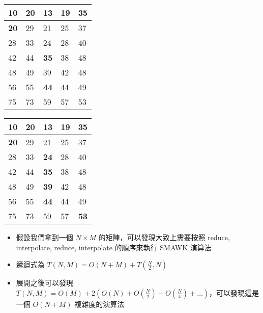 \documentclass[standalone]{beamer}
\begin{document}
\begin{frame}{}
  \begin{center}
    \begin{tabular}{|p{}|p{}|p{}|p{}|p{}|}
      \hline
      10 & 20 & 13 & 19 & 35 \\ [3ex]
      \hline
      \textbf{20} & 29 & 21 & 25 & 37 \\ [3ex]
      \hline
      28 & 33 & 24 & 28 & 40 \\ [3ex]
      \hline
      42 & 44 & \textbf{35} & 38 & 48 \\ [3ex]
      \hline
      48 & 49 & 39 & 42 & 48 \\ [3ex]
      \hline
      56 & 55 & \textbf{44} & 44 & 49 \\ [3ex]
      \hline
      75 & 73 & 59 & 57 & 53 \\ [3ex]
      \hline
    \end{tabular}
  \end{center}
\end{frame}


\begin{frame}{}
  \begin{center}
    \begin{tabular}{|p{}|p{}|p{}|p{}|p{}|}
      \hline
      \textbf{10} & 20 & 13 & 19 & 35 \\ [3ex]
      \hline
      \textbf{20} & 29 & 21 & 25 & 37 \\ [3ex]
      \hline
      28 & 33 & \textbf{24} & 28 & 40 \\ [3ex]
      \hline
      42 & 44 & \textbf{35} & 38 & 48 \\ [3ex]
      \hline
      48 & 49 & \textbf{39} & 42 & 48 \\ [3ex]
      \hline
      56 & 55 & \textbf{44} & 44 & 49 \\ [3ex]
      \hline
      75 & 73 & 59 & 57 & \textbf{53} \\ [3ex]
      \hline
    \end{tabular}
  \end{center}
\end{frame}

\begin{frame}{}
  \begin{itemize}
    \item 假設我們拿到一個 $N \times M$ 的矩陣，可以發現大致上需要按照 reduce, interpolate, reduce, interpolate 的順序來執行 SMAWK 演算法
    \item 遞迴式為 $T(N, M) = O(N + M) + T(\frac{N}{2}, N)$
    \item 展開之後可以發現 $T(N, M) = O(M) + 2(O(N) + O(\frac{N}{2}) + O(\frac{N}{4}) + \dots)$，可以發現這是一個 $O(N + M)$ 複雜度的演算法
  \end{itemize}
\end{frame}
\end{document}
